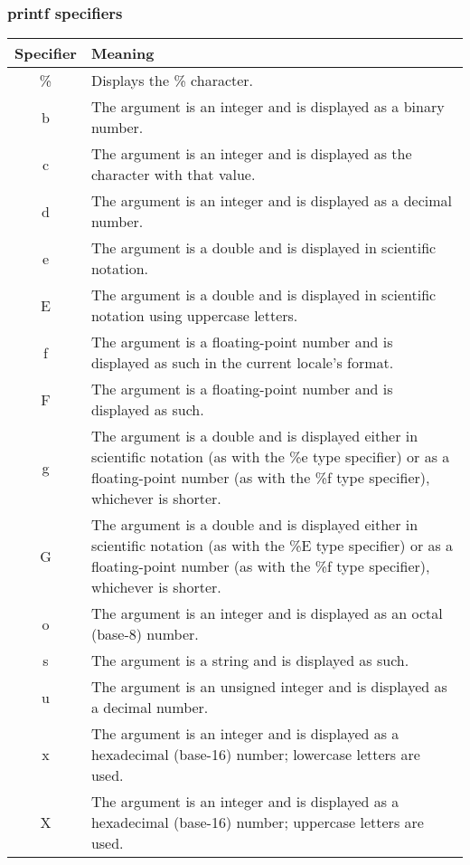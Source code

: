 \documentclass{report}
\begin{document}
\subsubsection{printf specifiers}
\bigbreak \noindent 
\begin{center}
    \begin{tabular}{|c|p{10cm}|}
        \hline
        \textbf{Specifier} & \textbf{Meaning} \\
        \hline
        \% & Displays the \% character. \\
        \hline
        b & The argument is an integer and is displayed as a binary number. \\
        \hline
        c & The argument is an integer and is displayed as the character with that value. \\
        \hline
        d & The argument is an integer and is displayed as a decimal number. \\
        \hline
        e & The argument is a double and is displayed in scientific notation. \\
        \hline
        E & The argument is a double and is displayed in scientific notation using uppercase letters. \\
        \hline
        f & The argument is a floating-point number and is displayed as such in the current locale’s format. \\
        \hline
        F & The argument is a floating-point number and is displayed as such. \\
        \hline
        g & The argument is a double and is displayed either in scientific notation (as with the \%e type specifier) or as a floating-point number (as with the \%f type specifier), whichever is shorter. \\
        \hline
        G & The argument is a double and is displayed either in scientific notation (as with the \%E type specifier) or as a floating-point number (as with the \%f type specifier), whichever is shorter. \\
        \hline
        o & The argument is an integer and is displayed as an octal (base-8) number. \\
        \hline
        s & The argument is a string and is displayed as such. \\
        \hline
        u & The argument is an unsigned integer and is displayed as a decimal number. \\
        \hline
        x & The argument is an integer and is displayed as a hexadecimal (base-16) number; lowercase letters are used. \\
        \hline
        X & The argument is an integer and is displayed as a hexadecimal (base-16) number; uppercase letters are used. \\
        \hline
    \end{tabular}
\end{center}
\end{document}
